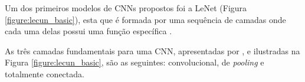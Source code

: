 \par Um dos primeiros modelos de CNNs propostos foi a LeNet \cite{LeCun1998} (Figura \ref{figure:lecun_basic}), esta que é formada por uma sequência de camadas onde cada uma delas possui uma função específica \cite{Carneiro2017}. 


\par As três camadas fundamentais para uma CNN, apresentadas por , e ilustradas na Figura \ref{figure:lecun_basic}, são as seguintes: convolucional, de \textit{pooling} e totalmente conectada.





